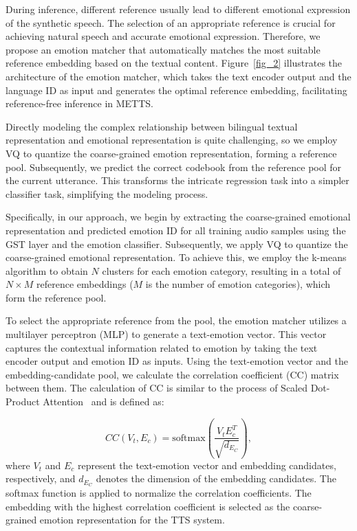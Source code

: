 \documentclass[journal,comsoc]{IEEEtran}
\begin{document}
During inference, different reference usually lead to different emotional expression of the synthetic speech. The selection of an appropriate reference is crucial for achieving natural speech and accurate emotional expression. Therefore, we propose an emotion matcher that automatically matches the most suitable reference embedding based on the textual content. Figure~\ref{fig_2} illustrates the architecture of the emotion matcher, which takes the text encoder output and the language ID as input and generates the optimal reference embedding, facilitating reference-free inference in METTS.

Directly modeling the complex relationship between bilingual textual representation and emotional representation is quite challenging, so we employ VQ to quantize the coarse-grained emotion representation, forming a reference pool. Subsequently, we predict the correct codebook from the reference pool for the current utterance. This transforms the intricate regression task into a simpler classifier task, simplifying the modeling process.


Specifically, in our approach, we begin by extracting the coarse-grained emotional representation and predicted emotion ID for all training audio samples using the GST layer and the emotion classifier. Subsequently, we apply VQ to quantize the coarse-grained emotional representation. To achieve this, we employ the k-means algorithm to obtain $N$ clusters for each emotion category, resulting in a total of $N \times M$ reference embeddings ($M$ is the number of emotion categories), which form the reference pool.

To select the appropriate reference from the pool, the emotion matcher utilizes a multilayer perceptron (MLP) to generate a text-emotion vector. This vector captures the contextual information related to emotion by taking the text encoder output and emotion ID as inputs. Using the text-emotion vector and the embedding-candidate pool, we calculate the correlation coefficient (CC) matrix between them. The calculation of CC is similar to the process of Scaled Dot-Product Attention~\cite{DBLP:conf/nips/VaswaniSPUJGKP17} and is defined as:

\begin{equation}
CC(V_{t},E_{c}) = \text{softmax}\left(\frac{V_{t}E_{c}^T}{\sqrt{d_{E_C}}}\right),
\end{equation}
where $V_t$ and $E_c$ represent the text-emotion vector and embedding candidates, respectively, and $d_{E_C}$ denotes the dimension of the embedding candidates. The softmax function is applied to normalize the correlation coefficients. The embedding with the highest correlation coefficient is selected as the coarse-grained emotion representation for the TTS system.
\end{document}
